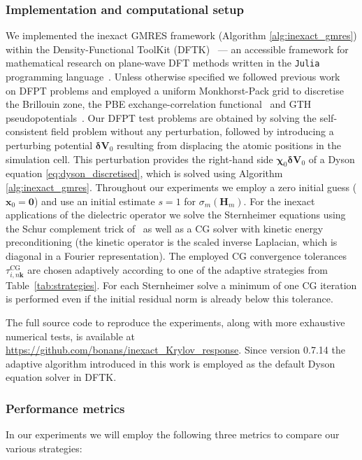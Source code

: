 \documentclass[hidelinks,onefignum,onetabnum]{siamart250211}
\newcommand{\taucg}{\tau^{\mathrm{CG}}}
\begin{document}
\subsubsection{Implementation and computational setup}
\label{sec:setup}
We implemented the inexact GMRES framework
(Algorithm \ref{alg:inexact_gmres})
within the Density-Functional ToolKit (DFTK)~\cite{herbst2021dftk}
--- an accessible framework for mathematical
research on plane-wave DFT methods written in the \texttt{Julia}
programming language~\cite{Bezanson2017}.
Unless otherwise specified
we followed previous work~\cite{cances2023numerical} on DFPT problems and employed
a uniform Monkhorst-Pack grid to discretise the Brillouin zone,
the PBE exchange-correlation functional~\cite{perdew1996gga} and
GTH pseudopotentials~\cite{goedecker1996separable,hartwigsen1998relativistic}.
Our DFPT test problems are obtained by solving
the self-consistent field problem without any perturbation,
followed by introducing a perturbing potential $\bm{\delta V}_0$
resulting from displacing the atomic positions in the simulation cell.
This perturbation provides the right-hand side $\bm{\chi}_0 \bm{\delta V}_0$
of a Dyson equation \eqref{eq:dyson_discretised},
which is solved using Algorithm \ref{alg:inexact_gmres}.
Throughout our experiments we employ a zero initial guess ($\bm x_0 = \bm 0$)
and use an initial estimate $s=1$ for $\sigma_m(\bm H_m)$.
For the inexact applications %
of the dielectric operator we solve the Sternheimer equations
using the Schur complement trick of~\cite{cances2023numerical} as well as
a CG solver with kinetic energy preconditioning
(the kinetic operator is the scaled inverse Laplacian,
which is diagonal in a Fourier representation).
%
%
%
The employed CG convergence tolerances $\taucg_{i,n\bm k}$
are chosen adaptively according to one of the adaptive strategies
from Table~\ref{tab:strategies}.
For each Sternheimer solve a minimum of one CG iteration is performed
even if the initial residual norm is already below this tolerance.

%
The full source code to reproduce the experiments,
along with more exhaustive numerical tests, is available
at \url{https://github.com/bonans/inexact_Krylov_response}.
Since version 0.7.14 the adaptive algorithm introduced in this work
is employed as the default Dyson equation solver in DFTK.

\subsubsection{Performance metrics}
In our experiments we will employ the following three metrics
to compare our various strategies:
%
%
%
%
%
%
\end{document}

